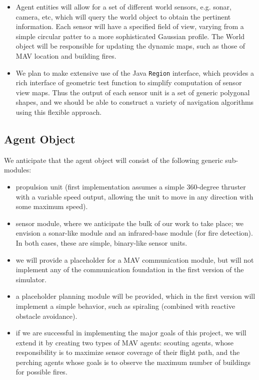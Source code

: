 \documentclass{article}
\begin{document}
\begin{itemize}
\item Agent entities will allow for a set of different world sensors, e.g. sonar, camera, etc, which will query the world object to obtain the pertinent information.  Each sensor will have a specified field of view, varying from a simple circular patter to a more sophisticated Gaussian profile.  The World object will be responsible for updating the dynamic maps, such as those of MAV location and building fires.

\item We plan to make extensive use of the Java {\tt Region} interface, which provides a rich interface of geometric test function to simplify computation of sensor view maps.  Thus the output of each sensor unit is a set of generic polygonal shapes, and we should be able to construct a variety of navigation algorithms using this flexible approach.
\end{itemize}


\subsection{Agent Object}
We anticipate that the agent object will consist of the following generic sub-modules:

\begin{itemize}
\item propulsion unit (first implementation assumes a simple 360-degree thruster with a variable speed output, allowing the unit to move in any direction with some maximum speed).

\item sensor module, where we anticipate the bulk of our work to take place; we envision a sonar-like module and an infrared-base module (for fire detection).  In both cases, these are simple, binary-like sensor units.

\item we will provide a placeholder for a MAV communication module, but will not implement any of the communication foundation in the first version of the simulator.

\item a placeholder planning module will be provided, which in the first version will implement a simple behavior, such as spiraling (combined with reactive obstacle avoidance).

\item if we are successful in implementing the major goals of this project, we will extend it by creating two types of MAV agents: scouting agents, whose responsibility is to maximize sensor coverage of their flight path, and the perching agents whose goals is to observe the maximum number of buildings for possible fires.
\end{itemize}
\end{document}
